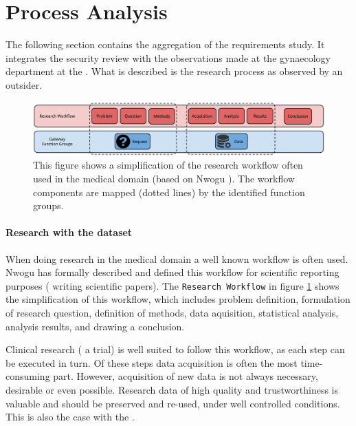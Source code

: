 \section{Process Analysis}
\label{process-analysis}

The following section contains the aggregation of the requirements study.
It integrates the security review with the observations made at the gynaecology department at the \AMC{}.
What is described is the research process as observed by an outsider.

\begin{figure}[!h]
	\centering
	\includegraphics[width=1.0\linewidth]{images/research-workflow}
	\caption{
		This figure shows a simplification of the research workflow often used  in the medical domain (based on Nwogu \cite{nwogu}).
		The workflow components are mapped (dotted lines) by the identified \ivfsystem{} function groups.
	}
	\label{fig:research-workflow}
\end{figure}

\paragraph{Research with the \project{} dataset}

When doing research in the medical domain a well known workflow is often used. Nwogu \cite{nwogu} has formally described and defined this workflow for scientific reporting purposes (\ie{} writing scientific papers).
The {\tt Research Workflow} in figure \ref{fig:research-workflow} shows the simplification of this workflow, which includes problem definition, formulation of research question, definition of methods, data aquisition, statistical analysis, analysis results, and drawing a conclusion.

Clinical research (\eg{} a trial) is well suited to follow this workflow, as each step can be executed in turn.
Of these steps data acquisition is often the most time-consuming part.
However, acquisition of new data is not always necessary,  desirable or even possible. 
Research data of high quality and trustworthiness is valuable and should be preserved and re-used, under well controlled conditions. 
This is also the case with the \projectdata{}.

